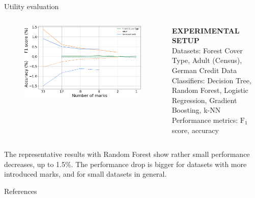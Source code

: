 \documentclass[final,hyperref={pdfpagelabels=true}]{beamer}
\begin{document}
\begin{frame}
\begin{columns}[t]
\begin{column}{.45\textwidth}
      \begin{block}{Utility evaluation}
      \begin{columns}
        \begin{column}{.49\textwidth}
        \begin{figure}
            \centering
            \includegraphics[width=\textwidth]{classification_poster.png}
        \end{figure}
        \end{column}
        \begin{column}{.49\textwidth}
        \small
            \textbf{EXPERIMENTAL SETUP}\\
            \textcolor{TuWienBlue}{Datasets}: Forest Cover Type, Adult (Census), German Credit Data\\
            \textcolor{TuWienBlue}{Classifiers}: Decision Tree, Random Forest, Logistic Regression, Gradient Boosting, k-NN\\
            \textcolor{TuWienBlue}{Performance metrics}: $\text{F}_1$ score, accuracy
        \end{column}
      \end{columns}
      \bigskip
      \small
      The representative results with Random Forest show rather small performance decreases, up to 1.5\%. The performance drop is bigger for datasets with more introduced marks, and for small datasets in general.
      \end{block}
      
      \begin{block}{References}
      \scriptsize
        \nocite{li2005fingerprinting}
        \nocite{liu2004block}
        \nocite{guo2006fingerprinting}
        \nocite{sarcevic2019evaluation}
        
        
      \end{block}

    \end{column}
  \end{columns}
  
\end{frame}
\end{document}
